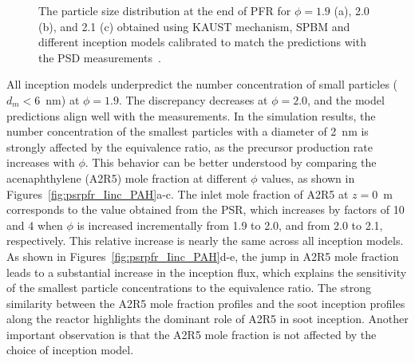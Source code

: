 \begin{figure}[H]
	\centering
	\caption{The particle size distribution at the end of PFR for $\phi=1.9$ (a), 2.0 (b), and 2.1 (c) obtained using KAUST mechanism, SPBM and different inception models calibrated to match the predictions with the PSD measurements~\citep{manzello2007soot}.}
	\label{fig:psrpfr_psd} 
\end{figure}

All inception models underpredict the number concentration of small particles ($d_m < 6$~nm) at $\phi = 1.9$. The discrepancy decreases at $\phi = 2.0$, and the model predictions align well with the measurements. In the simulation results, the number concentration of the smallest particles with a diameter of 2~nm is strongly affected by the equivalence ratio, as the precursor production rate increases with $\phi$. This behavior can be better understood by comparing the acenaphthylene (A2R5) mole fraction at different $\phi$ values, as shown in Figures~\ref{fig:psrpfr_Iinc_PAH}a-c. The inlet mole fraction of A2R5 at $z = 0$~m corresponds to the value obtained from the PSR, which increases by factors of 10 and 4 when $\phi$ is increased incrementally from 1.9 to 2.0, and from 2.0 to 2.1, respectively. This relative increase is nearly the same across all inception models. As shown in Figures~\ref{fig:psrpfr_Iinc_PAH}d-e, the jump in A2R5 mole fraction leads to a substantial increase in the inception flux, which explains the sensitivity of the smallest particle concentrations to the equivalence ratio. The strong similarity between the A2R5 mole fraction profiles and the soot inception profiles along the reactor highlights the dominant role of A2R5 in soot inception. Another important observation is that the A2R5 mole fraction is not affected by the choice of inception model.


